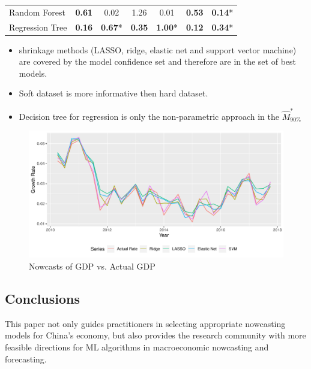 \documentclass[thesis]{hmcposter}
\begin{document}
\begin{poster}
\begin{table}
\begin{small}
\begin{tabular}{lcc|cc|cc}
  \rowcolor{Gray}
  Random Forest & \textbf{0.61} & 0.02 & 1.26 & 0.01 & \textbf{0.53} & \textbf{0.14}* \\ 
  \rowcolor{Gray}
  Regression Tree & \textbf{0.16} & \textbf{0.67}* & \textbf{0.35} & \textbf{1.00}* & \textbf{0.12} & \textbf{0.34}* \\ 
\bottomrule
\end{tabular}
\end{small}
\end{table}
\begin{itemize}
    \item shrinkage methods (LASSO, ridge, elastic net and support vector machine) are covered by the model confidence set and therefore are in the set of best models.
    \item Soft dataset is more informative then hard dataset.
    \item Decision tree for regression is only the non-parametric approach in the $\hat{M}^*_{90\%}$
\end{itemize}

\vspace{1.2cm}
\begin{figure}
    \centering
    \includegraphics[scale=1.7]{LASSO.pdf}
    \caption{Nowcasts of GDP vs. Actual GDP}
\end{figure}
\subsection{Conclusions}
This paper not only guides practitioners in selecting appropriate nowcasting models for China's economy, but also provides the research community with more feasible directions for ML algorithms in macroeconomic nowcasting and forecasting.
\end{poster}
\end{document}
